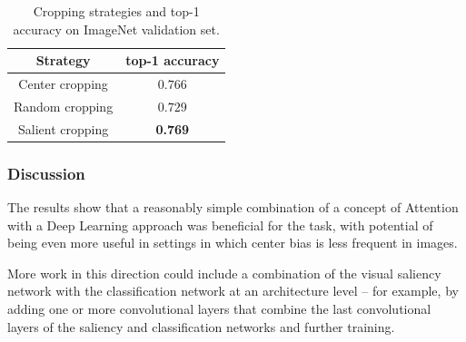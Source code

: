 \documentclass[12pt]{article}
\begin{document}
\begin{table}[H]
\centering
	\small
\caption{Cropping strategies and top-1 accuracy on ImageNet validation set.}
\begin{tabular}{|c|c|}
	\hline
    Strategy & top-1 accuracy\\
    \hline
    Center cropping & $0.766$\\
    \hline
    Random cropping & $0.729$\\
    \hline
    Salient cropping & \textbf{0.769}\\
    \hline
\end{tabular}
\label{table:results}
\end{table}

\subsubsection{Discussion}
The results show that a reasonably simple combination of a concept of Attention with a Deep Learning
approach was beneficial for the task, with potential of being even more useful in settings in which
center bias is less frequent in images.

More work in this direction could include a combination of the visual saliency network with
the classification network at an architecture level
-- for example, by adding one or more convolutional layers that combine the last convolutional layers
of the saliency and classification networks and further training.
\end{document}

